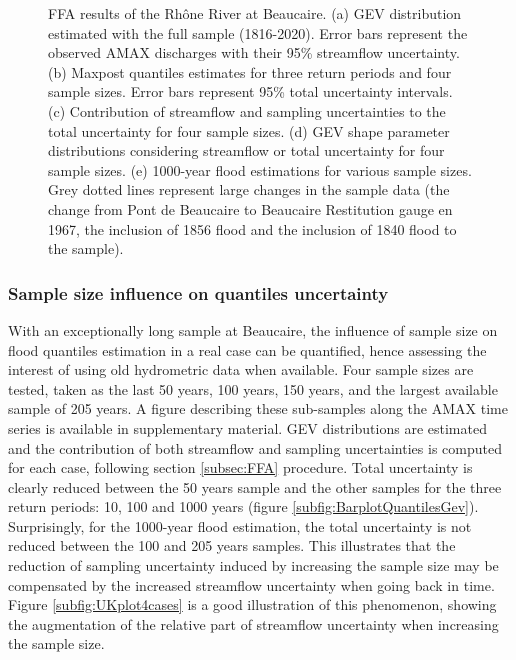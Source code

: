 \documentclass[11pt]{article}
\begin{document}
\begin{figure}[p]
            
        \caption{FFA results of the Rhône River at Beaucaire. (a) GEV distribution estimated with the full sample (1816-2020). Error bars represent the observed AMAX discharges with their 95\% streamflow uncertainty.
        (b) Maxpost quantiles estimates for three return periods and four sample sizes. Error bars represent 95\% total uncertainty intervals.
        (c) Contribution of streamflow and sampling uncertainties to the total uncertainty for four sample sizes. 
        (d) GEV shape parameter distributions considering streamflow or total uncertainty for four sample sizes. 
        (e) 1000-year flood estimations for various sample sizes. Grey dotted lines represent large changes in the sample data (the change from Pont de Beaucaire to Beaucaire Restitution gauge en 1967, the inclusion of 1856 flood and the inclusion of 1840 flood to the sample).}
        \label{fig:Quantiles}
        \end{figure}

        \subsubsection{Sample size influence on quantiles uncertainty}
        \label{subsec:SampleSize}
        
        With an exceptionally long sample at Beaucaire, the influence of sample size on flood quantiles estimation in a real case can be quantified, hence assessing the interest of using old hydrometric data when available. Four sample sizes are tested, taken as the last 50 years, 100 years, 150 years, and the largest available sample of 205 years. A figure describing these sub-samples along the AMAX time series is available in supplementary material. GEV distributions are estimated and the contribution of both streamflow and sampling uncertainties is computed for each case, following section \ref{subsec:FFA} procedure. Total uncertainty is clearly reduced between the 50 years sample and the other samples for the three return periods: 10, 100 and 1000 years (figure \ref{subfig:BarplotQuantilesGev}). Surprisingly, for the 1000-year flood estimation, the total uncertainty is not reduced between the 100 and 205 years samples. This illustrates that the reduction of sampling uncertainty induced by increasing the sample size may be compensated by the increased streamflow uncertainty when going back in time. Figure \ref{subfig:UKplot4cases} is a good illustration of this phenomenon, showing the augmentation of the relative part of streamflow uncertainty when increasing the sample size.
        
\end{document}
